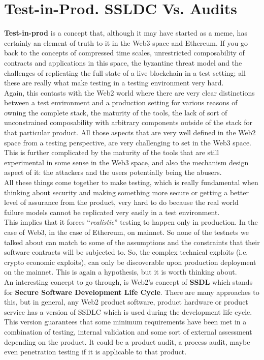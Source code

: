 \section{Test-in-Prod. SSLDC Vs. Audits}

\textbf{Test-in-prod} is a concept that, although it may have started as a meme, has certainly an element of truth to it in the Web3 space and Ethereum.
If you go back to the concepts of compressed time scales, unrestricted composability of contracts and applications in this space, the byzantine threat model and the challenges of replicating the full state of a live blockchain in a test setting; all these are really what make testing in a testing environment very hard.\\

Again, this contasts with the Web2 world where there are very clear distinctions between a test environment and a production setting for various reasons of owning the complete stack, the maturity of the tools, the lack of sort of unconstrained composability with arbitrary components outside of the stack for that particular product.
All those aspects that are very well defined in the Web2 space from a testing perspective, are very challenging to set in the Web3 space.
This is further complicated by the maturity of the tools that are still experimental in some sense in the Web3 space, and also the mechanism design aspect of it: the attackers and the users potentially being the abusers.\\

All these things come together to make testing, which is really fundamental when thinking about security and making something more secure or getting a better level of assurance from the product, very hard to do because the real world failure models cannot be replicated very easily in a test environment.\\

This implies that it forces ``\textit{realistic}'' testing to happen only in production.
In the case of Web3, in the case of Ethereum, on mainnet.
So none of the testnets we talked about can match to some of the assumptions and the constraints that their software contracts will be subjected to.
So, the complex technical exploits (i.e. crypto economic exploits), can only be discoverable upon production deployment on the mainnet.
This is again a hypothesis, but it is worth thinking about.\\

An interesting concept to go through, is Web2's concept of \textbf{SSDL} which stands for \textbf{Secure Software Development Life Cycle}.
There are many approaches to this, but in general, any Web2 product software, product hardware or product service has a version of SSDLC which is used during the development life cycle.
This version guarantees that some minimum requirements have been met in a combination of testing, internal validation and some sort of external assessment depending on the product.
It could be a product audit, a process audit, maybe even penetration testing if it is applicable to that product.\\

